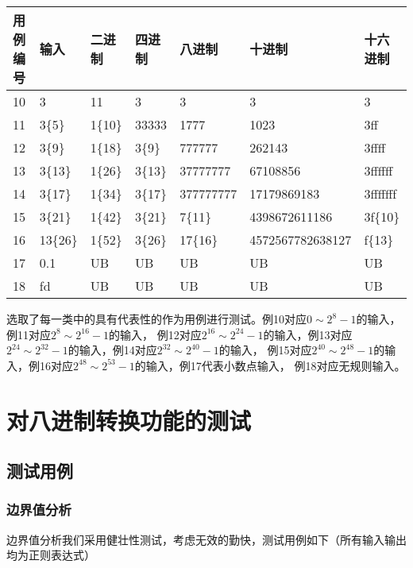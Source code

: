 \documentclass[12pt, a4paper, oneside]{ctexart}
\begin{document}
\begin{table}[!h]
    \begin{tabular}{|l|l|l|l|l|l|l|}
    \hline
    用例编号 & 输入 & 二进制 & 四进制 & 八进制 & 十进制 & 十六进制 \\ \hline
    10 & 3 & 11 & 3 & 3 & 3 & 3 \\ \hline
    11 & 3\{5\} & 1\{10\} & 33333 & 1777 & 1023 & 3ff \\ \hline
    12 & 3\{9\} & 1\{18\} & 3\{9\} & 777777 & 262143 & 3ffff \\ \hline
    13 & 3\{13\} & 1\{26\} & 3\{13\} & 37777777 & 67108856 & 3ffffff \\ \hline
    14 & 3\{17\} & 1\{34\}& 3\{17\} & 377777777 & 17179869183 & 3fffffff \\ \hline
    15 & 3\{21\}& 1\{42\} & 3\{21\} & 7\{11\}& 4398672611186 & 3f\{10\} \\ \hline
    16 & 13\{26\} & 1\{52\}& 3\{26\} & 17\{16\} & 4572567782638127 & f\{13\}\\ \hline
    17 & 0.1 & UB &UB &UB &UB &UB \\ \hline
    18 & fd &UB &UB &UB &UB &UB \\ \hline
    \end{tabular}
\end{table}
选取了每一类中的具有代表性的作为用例进行测试。例10对应$0\sim2^{8}-1$的输入，例11对应$2^{8}\sim2^{16}-1$的输入，
例12对应$2^{16}\sim2^{24}-1$的输入，例13对应$2^{24}\sim2^{32}-1$的输入，例14对应$2^{32}\sim2^{40}-1$的输入，
例15对应$2^{40}\sim2^{48}-1$的输入，例16对应$2^{48}\sim2^{53}-1$的输入，例17代表小数点输入，
例18对应无规则输入。



\section{对八进制转换功能的测试}
\subsection{测试用例}
\subsubsection{边界值分析}
边界值分析我们采用健壮性测试，考虑无效的勤快，测试用例如下（所有输入输出均为正则表达式）
\end{document}
